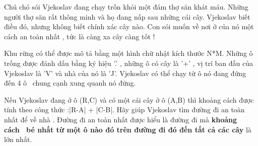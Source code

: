 Chú chó sói Vjekoslav đang chạy trốn khỏi một đám thợ săn khát máu. Những người thợ săn rất thông minh và họ đang nấp sau những cái cây. Vjekoslav biết điều đó, nhưng không biết chính xác cây nào. Con sói muốn về nơi ở của nó một cách an toàn nhất , tức là càng xa cây càng tốt !  

   Khu rừng có thể được mô tả bằng một hình chữ nhật kích thước N*M. Những ô trống được đánh dấu bằng ký hiệu '.' , những ô có cây là '+' , vị trí ban đầu của Vjekoslav là 'V' và nhà của nó là 'J'. Vjekoslav có thể chạy từ ô nó đang đứng đến 4 ô  chung cạnh xung quanh nó đứng.  

   Nếu Vjekoslav đang ở ô (R,C) và có một cái cây ở ô (A,B) thì khoảng cách được tính theo công thức :|R-A| + |C-B|. Hãy giúp Vjekoslav tìm đường đi an toàn nhất để về nhà . Đường đi an toàn nhất được hiểu là đường đi mà   \textbf{    khoảng cách  bé nhất từ một ô nào đó trên đường đi đó đến tất cả các cây   }   là lớn nhất.